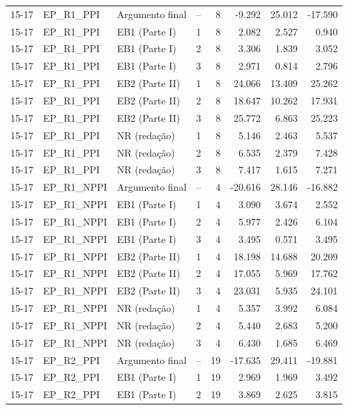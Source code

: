\begin{longtable}{lllcrrrr}
15-17 & EP\_R1\_PPI & Argumento final & -- & 8 & -9.292 & 25.012 & -17.590 \\
15-17 & EP\_R1\_PPI & EB1 (Parte I) & 1 & 8 & 2.082 & 2.527 & 0.940 \\
15-17 & EP\_R1\_PPI & EB1 (Parte I) & 2 & 8 & 3.306 & 1.839 & 3.052 \\
15-17 & EP\_R1\_PPI & EB1 (Parte I) & 3 & 8 & 2.971 & 0.814 & 2.796 \\
15-17 & EP\_R1\_PPI & EB2 (Parte II) & 1 & 8 & 24.066 & 13.409 & 25.262 \\
15-17 & EP\_R1\_PPI & EB2 (Parte II) & 2 & 8 & 18.647 & 10.262 & 17.931 \\
15-17 & EP\_R1\_PPI & EB2 (Parte II) & 3 & 8 & 25.772 & 6.863 & 25.223 \\
15-17 & EP\_R1\_PPI & NR (redação) & 1 & 8 & 5.146 & 2.463 & 5.537 \\
15-17 & EP\_R1\_PPI & NR (redação) & 2 & 8 & 6.535 & 2.379 & 7.428 \\
15-17 & EP\_R1\_PPI & NR (redação) & 3 & 8 & 7.417 & 1.615 & 7.271 \\
15-17 & EP\_R1\_NPPI & Argumento final & -- & 4 & -20.616 & 28.146 & -16.882 \\
15-17 & EP\_R1\_NPPI & EB1 (Parte I) & 1 & 4 & 3.090 & 3.674 & 2.552 \\
15-17 & EP\_R1\_NPPI & EB1 (Parte I) & 2 & 4 & 5.977 & 2.426 & 6.104 \\
15-17 & EP\_R1\_NPPI & EB1 (Parte I) & 3 & 4 & 3.495 & 0.571 & 3.495 \\
15-17 & EP\_R1\_NPPI & EB2 (Parte II) & 1 & 4 & 18.198 & 14.688 & 20.209 \\
15-17 & EP\_R1\_NPPI & EB2 (Parte II) & 2 & 4 & 17.055 & 5.969 & 17.762 \\
15-17 & EP\_R1\_NPPI & EB2 (Parte II) & 3 & 4 & 23.031 & 5.935 & 24.101 \\
15-17 & EP\_R1\_NPPI & NR (redação) & 1 & 4 & 5.357 & 3.992 & 6.084 \\
15-17 & EP\_R1\_NPPI & NR (redação) & 2 & 4 & 5.440 & 2.683 & 5.200 \\
15-17 & EP\_R1\_NPPI & NR (redação) & 3 & 4 & 6.430 & 1.685 & 6.469 \\
15-17 & EP\_R2\_PPI & Argumento final & -- & 19 & -17.635 & 29.411 & -19.881 \\
15-17 & EP\_R2\_PPI & EB1 (Parte I) & 1 & 19 & 2.969 & 1.969 & 3.492 \\
15-17 & EP\_R2\_PPI & EB1 (Parte I) & 2 & 19 & 3.869 & 2.625 & 3.815 \\

\end{longtable}

